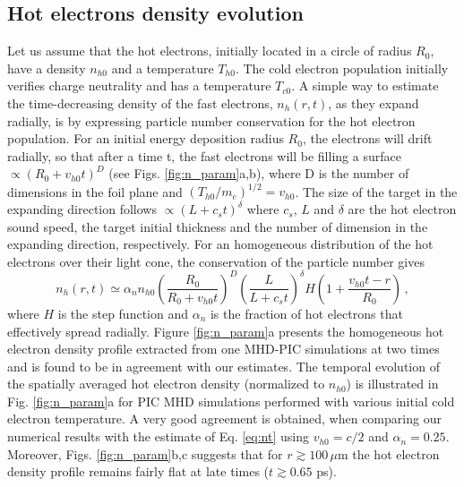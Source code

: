 \documentclass[aps,showpacs,superscriptaddress]{revtex4}
\begin{document}
\subsection{Hot electrons density evolution}
Let us assume that the hot electrons, initially located in a circle of radius $R_0$, have a density   $n_{h0}$ and a temperature $T_{h0}$. The cold electron  population initially verifies charge neutrality and has a temperature $T_{c0}$.
A simple way to estimate the time-decreasing density of the fast electrons, $n_h(r,t)$, as they expand radially, is by expressing particle number conservation for  the hot electron population.
For an initial energy  deposition radius $R_0$, the electrons will drift radially, so that after a time t, the fast electrons will be  filling a surface $\propto ( R_0 + v_{h0}t)^D$ (see Figs. \ref{fig:n_param}a,b), where D is the number of dimensions in the foil plane and $(T_{h0}/m_e)^{1/2}= v_{h0}$.
The size of the target in the expanding direction follows $\propto (L+c_st)^\delta$ where $c_s$, $L$ and $\delta$ are  the hot electron sound speed, the target initial thickness and the number of dimension in the expanding direction, respectively. 
For an homogeneous distribution of the hot electrons over their light cone, the conservation of the particle number gives
\begin{equation} \label{eq:nt}
n_h(r,t)  \simeq\alpha_n n_{h0} \left( \frac{R_0}{R_0 + v_{h0}t } \right)^D \left( \frac{L}{L + c_{s}t } \right)^\delta  H \left( 1 + \frac{v_{h0}t-r}{R_0} \right) \, ,
\end{equation}
where $H$ is the step function and $\alpha_n$  is the fraction of hot electrons that effectively spread radially.
Figure  \ref{fig:n_param}a presents the  homogeneous  hot electron density profile extracted from one  MHD-PIC simulations at two times  and is found to be in agreement with our estimates.
The temporal evolution of the spatially averaged hot electron density (normalized to $n_{h0}$) is illustrated in Fig. \ref{fig:n_param}a for PIC MHD simulations performed with various initial cold electron temperature. 
A  very good agreement is obtained, when comparing  our numerical results  with the  estimate of Eq. \eqref{eq:nt} using $v_{h0} = c/2$ and $\alpha_n = 0.25$.
Moreover, Figs. \ref{fig:n_param}b,c suggests that for $r\gtrsim 100\,\mu$m  the hot electron density profile remains fairly flat at late times ($t\gtrsim 0.65$ ps).
\end{document}
